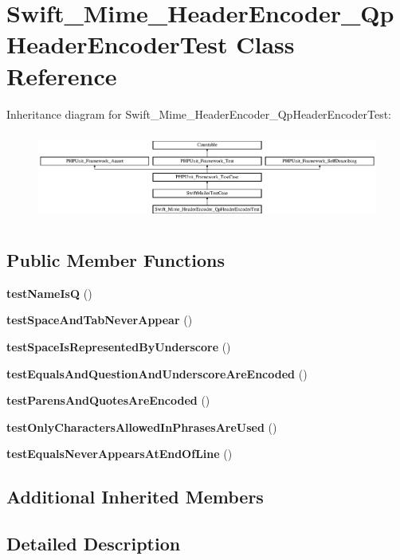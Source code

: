 \section{Swift\+\_\+\+Mime\+\_\+\+Header\+Encoder\+\_\+\+Qp\+Header\+Encoder\+Test Class Reference}
\label{class_swift___mime___header_encoder___qp_header_encoder_test}
Inheritance diagram for Swift\+\_\+\+Mime\+\_\+\+Header\+Encoder\+\_\+\+Qp\+Header\+Encoder\+Test\+:\begin{figure}[H]
\begin{center}
\leavevmode
\includegraphics[height=2.935010cm]{class_swift___mime___header_encoder___qp_header_encoder_test}
\end{center}
\end{figure}
\subsection*{Public Member Functions}
\begin{DoxyCompactItemize}
\item 
{\bf test\+Name\+Is\+Q} ()
\item 
{\bf test\+Space\+And\+Tab\+Never\+Appear} ()
\item 
{\bf test\+Space\+Is\+Represented\+By\+Underscore} ()
\item 
{\bf test\+Equals\+And\+Question\+And\+Underscore\+Are\+Encoded} ()
\item 
{\bf test\+Parens\+And\+Quotes\+Are\+Encoded} ()
\item 
{\bf test\+Only\+Characters\+Allowed\+In\+Phrases\+Are\+Used} ()
\item 
{\bf test\+Equals\+Never\+Appears\+At\+End\+Of\+Line} ()
\end{DoxyCompactItemize}
\subsection*{Additional Inherited Members}


\subsection{Detailed Description}


